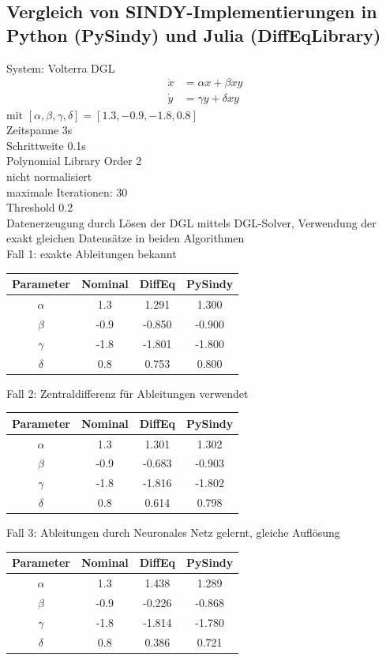 \documentclass[arbeit=studie,oneside,BCOR=12mm]{ArbeitRST}
\begin{document}
\subsection{Vergleich von SINDY-Implementierungen in Python (PySindy) und Julia (DiffEqLibrary)}
System: Volterra DGL
\begin{align}
\dot{x} &= \alpha x +\beta xy\\
\dot{y} &= \gamma y + \delta xy 
\end{align}
mit $[\alpha, \beta, \gamma, \delta] = [1.3, -0.9, -1.8, 0.8]$\\
Zeitspanne 3s\\
Schrittweite 0.1s\\
Polynomial Library Order 2\\
nicht normalisiert\\
maximale Iterationen: 30\\
Threshold 0.2\\
Datenerzeugung durch Lösen der DGL mittels DGL-Solver, Verwendung der exakt gleichen Datensätze in beiden Algorithmen\\
Fall 1: exakte Ableitungen bekannt\\
\begin{tabular}[h]{c|c|c|c}
Parameter 	& Nominal 	& DiffEq		& PySindy 	\\\hline
$\alpha$ 	&  	 1.3	& 	1.291		&	1.300		\\\hline
$\beta$ 	&  	-0.9	& 	-0.850		&	-0.900		\\\hline
$\gamma$ 	&  	 -1.8	& 	-1.801		&	-1.800		\\\hline
$\delta$ 	&  	0.8		& 	0.753		&	0.800		\\
\end{tabular}

Fall 2: Zentraldifferenz für Ableitungen verwendet\\
\begin{tabular}[h]{c|c|c|c}
Parameter 	& Nominal 	& DiffEq		& PySindy 	\\\hline
$\alpha$ 	&  	 1.3	& 	1.301		&	1.302		\\\hline
$\beta$ 	&  	-0.9	& 	-0.683		&	-0.903		\\\hline
$\gamma$ 	&  	 -1.8	& 	-1.816		&	-1.802		\\\hline
$\delta$ 	&  	0.8		& 	0.614		&	0.798		\\
\end{tabular}

Fall 3: Ableitungen durch Neuronales Netz gelernt, gleiche Auflösung\\
\begin{tabular}[h]{c|c|c|c}
Parameter 	& Nominal 	& DiffEq		& PySindy 	\\\hline
$\alpha$ 	&  	 1.3	& 	1.438		&	1.289		\\\hline
$\beta$ 	&  	-0.9	& 	-0.226		&	-0.868		\\\hline
$\gamma$ 	&  	 -1.8	& 	-1.814		&	-1.780		\\\hline
$\delta$ 	&  	0.8		& 	0.386		&	0.721		\\
\end{tabular}
\end{document}
